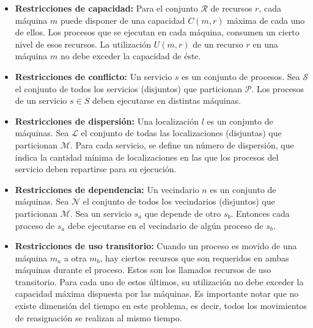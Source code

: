 \begin{itemize}

	\item \textbf{Restricciones de capacidad:} Para el conjunto $\mathcal{R}$ de recursos $r$, cada máquina $m$ puede disponer de una capacidad $C(m,r)$ máxima de cada uno de ellos. Los procesos que se ejecutan en cada máquina, consumen un cierto nivel de esos recursos. La utilización $U(m,r)$ de un recurso $r$ en una máquina $m$ no debe exceder la capacidad de éste.

	\item \textbf{Restricciones de conflicto:} Un servicio $s$ es un conjunto de procesos. Sea $\mathcal{S}$ el conjunto de todos los servicios (disjuntos) que particionan $\mathcal{P}$. Los procesos de un servicio $s \in S$ deben ejecutarse en distintas máquinas.

	\item \textbf{Restricciones de dispersión:} Una localización $l$ es un conjunto de máquinas. Sea $\mathcal{L}$ el conjunto de todas las localizaciones (disjuntas) que particionan $\mathcal{M}$. Para cada servicio, se define un número de dispersión, que indica la cantidad mínima de localizaciones en las que los procesos del servicio deben repartirse para su ejecución.

	\item \textbf{Restricciones de dependencia:} Un vecindario $n$ es un conjunto de máquinas. Sea $\mathcal{N}$ el conjunto de todos los vecindarios (disjuntos) que particionan $\mathcal{M}$. Sea un servicio $s_a$ que depende de otro $s_b$. Entonces cada proceso de $s_a$ debe ejecutarse en el vecindario de algún proceso de $s_b$.

	\item \textbf{Restricciones de uso transitorio:} Cuando un proceso es movido de una máquina $m_a$ a otra $m_b$, hay ciertos recursos que son requeridos en ambas máquinas durante el proceso. Estos son los llamados recursos de uso transitorio. Para cada uno de estos últimos, su utilización no debe exceder la capacidad máxima dispuesta por las máquinas. Es importante notar que no existe dimensión del tiempo en este problema, es decir, todos los movimientos de reasignación se realizan al mismo tiempo.

\end{itemize}

